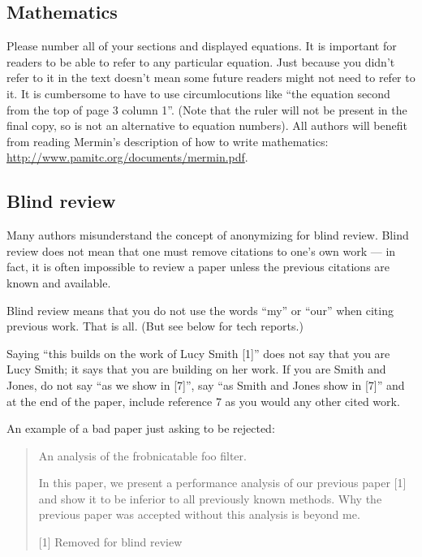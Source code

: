 \documentclass[10pt,twocolumn,letterpaper]{article}
\begin{document}
\subsection{Mathematics}

Please number all of your sections and displayed equations.  It is
important for readers to be able to refer to any particular equation.  Just
because you didn't refer to it in the text doesn't mean some future readers
might not need to refer to it.  It is cumbersome to have to use
circumlocutions like ``the equation second from the top of page 3 column
1''.  (Note that the ruler will not be present in the final copy, so is not
an alternative to equation numbers).  All authors will benefit from reading
Mermin's description of how to write mathematics:
\url{http://www.pamitc.org/documents/mermin.pdf}.

\subsection{Blind review}

Many authors misunderstand the concept of anonymizing for blind
review.  Blind review does not mean that one must remove
citations to one's own work --- in fact, it is often impossible to
review a paper unless the previous citations are known and
available.

Blind review means that you do not use the words ``my'' or ``our''
when citing previous work.  That is all.  (But see below for
tech reports.)

Saying ``this builds on the work of Lucy Smith [1]'' does not say
that you are Lucy Smith; it says that you are building on her
work.  If you are Smith and Jones, do not say ``as we show in
[7]'', say ``as Smith and Jones show in [7]'' and at the end of the
paper, include reference 7 as you would any other cited work.

An example of a bad paper just asking to be rejected:
\begin{quote}
\begin{center}
    An analysis of the frobnicatable foo filter.
\end{center}

   In this paper, we present a performance analysis of our
   previous paper [1] and show it to be inferior to all
   previously known methods.  Why the previous paper was
   accepted without this analysis is beyond me.

   [1] Removed for blind review
\end{quote}
\end{document}
